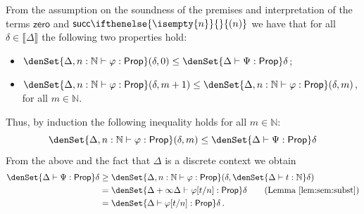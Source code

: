 \documentclass[a4paper,UKenglish,cleveref, autoref, thm-restate]{lipics-v2021}
\providecommand*{\ifempty}[3]{\ifthenelse{\isempty{#1}}{#2}{#3}}
\newcommand{\parensmathoper}[2]{\ensuremath{#1\ifempty{#2}{}{(#2)}}}
\newcommand{\nat}{\mathbb{N}}
\newcommand{\ts}{\vdash}
\newcommand{\hastype}[3]{#1\ts #2 : #3}
\newcommand{\Zero}{\mathsf{zero}}
\newcommand{\Succ}{\parensmathoper{\mathsf{succ}}}
\newcommand{\Prop}{\mathsf{Prop}}
\newcommand{\TD}{\mathcal{D}}
\newcommand{\den}[1]{\llbracket #1\rrbracket}
\begin{document}
\begin{description}[font=\sc,wide]
    \item[Rule (ind$_\nat$):] From the assumption on the soundness of the premises and interpretation of the terms $\Zero$ and $\Succ{n}$ we have that for all $\delta \in \den\Delta$ the following two properties hold:
    \begin{itemize}
        \item $\denSet{\hastype{\Delta, n:\nat}{\varphi}{\Prop}}(\delta,0) 
        \leq \denSet{\hastype{\Delta}{\Psi}{\Prop}}\delta$;
        \item $\denSet{\hastype{\Delta, n:\nat}{\varphi}{\Prop}}(\delta,m+1) 
        \leq \denSet{\hastype{\Delta, n:\nat}{\varphi}{\Prop}}(\delta,m)$, for all $m \in \nat$.
    \end{itemize}
    Thus, by induction %
    the following inequality holds for all $m \in \nat$:
    \begin{equation*}
        \denSet{\hastype{\Delta, n:\nat}{\varphi}{\Prop}}(\delta,m) 
        \leq \denSet{\hastype{\Delta}{\Psi}{\Prop}}\delta
    \end{equation*}
    From the above and the fact that $\Delta$ is a discrete context we obtain
    \begin{align*}
        \denSet{\hastype{\Delta}{\Psi}{\Prop}}\delta
        &\geq \denSet{\hastype{\Delta, n:\nat}{\varphi}{\Prop}}
            (\delta,\denSet{\hastype{\Delta}{t}{\nat}}\delta) \\
        &= \denSet{\hastype{\Delta+\infty\Delta}{\varphi[t/n]}{\Prop}}\delta
        \tag{Lemma~\ref{lem:sem:subst}}\\
        &= \denSet{\hastype{\Delta}{\varphi[t/n]}{\Prop}}\delta \,.
    \end{align*}

    

\end{description}
\end{document}
